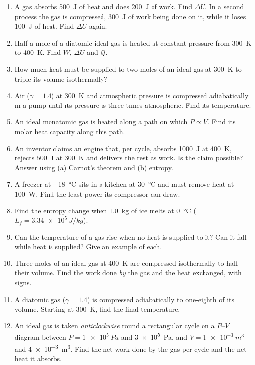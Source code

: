 \begin{enumerate}[itemsep=3pt]
\item A gas absorbs \SI{500}{J} of heat and does \SI{200}{J} of work. Find $\Delta U$. In a second process the
      gas is compressed, \SI{300}{J} of work being done on it, while it loses \SI{100}{J} of heat. Find
      $\Delta U$ again.
\item Half a mole of a diatomic ideal gas is heated at constant pressure from \SI{300}{K} to \SI{400}{K}. Find
      $W$, $\Delta U$ and $Q$.
\item How much heat must be supplied to two moles of an ideal gas at \SI{300}{K} to triple its volume
      isothermally?
\item Air ($\gamma=1.4$) at \SI{300}{K} and atmospheric pressure is compressed adiabatically in a pump until its
      pressure is three times atmospheric. Find its temperature.
\item An ideal monatomic gas is heated along a path on which $P\propto V$. Find its molar heat capacity along
      this path.
\item An inventor claims an engine that, per cycle, absorbs \SI{1000}{J} at \SI{400}{K}, rejects \SI{500}{J} at
      \SI{300}{K} and delivers the rest as work. Is the claim possible? Answer using (a) Carnot's theorem and
      (b) entropy.
\item A freezer at \SI{-18}{\celsius} sits in a kitchen at \SI{30}{\celsius} and must remove heat at
      \SI{100}{W}. Find the least power its compressor can draw.
\item Find the entropy change when \SI{1.0}{kg} of ice melts at \SI{0}{\celsius} ($L_f=\SI{3.34e5}{J/kg}$).
\item Can the temperature of a gas rise when no heat is supplied to it? Can it fall while heat is supplied?
      Give an example of each.
\item Three moles of an ideal gas at \SI{400}{K} are compressed isothermally to half their volume. Find
      the work done \emph{by} the gas and the heat exchanged, with signs.
\item A diatomic gas ($\gamma = 1.4$) is compressed adiabatically to one-eighth of its volume. Starting at
      \SI{300}{K}, find the final temperature.
\item An ideal gas is taken \emph{anticlockwise} round a rectangular cycle on a $P$--$V$ diagram between $P = \SI{1e5}{Pa}$ and \SI{3e5}{Pa}, and $V = \SI{1e-3}{m^3}$ and \SI{4e-3}{m^3}. Find the net work done by the gas per cycle and the net heat it absorbs.

\end{enumerate}

